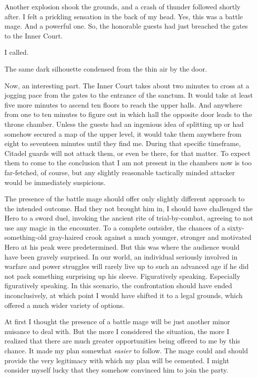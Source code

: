 Another explosion shook the grounds, and a crash of thunder followed shortly after. I felt a prickling sensation in the back of my head. Yes, this was a battle mage. And a powerful one. So, the honorable guests had just breached the gates to the Inner Court.

 I called.

 The same dark silhouette condensed from the thin air by the door.



Now, an interesting part. The Inner Court takes about two minutes to cross at a jogging pace from the gates to the entrance of the sanctum. It would take at least five more minutes to ascend ten floors to reach the upper halls. And anywhere from one to ten minutes to figure out in which hall the opposite door leads to the throne chamber. Unless the guests had an ingenious idea of splitting up or had somehow secured a map of the upper level, it would take them anywhere from eight to seventeen minutes until they find me. During that specific timeframe, Citadel guards will not attack them, or even be there, for that matter. To expect them to come to the conclusion that I am not present in the chambers now is too far-fetched, of course, but any slightly reasonable tactically minded attacker would be immediately suspicious.

The presence of the battle mage should offer only slightly different approach to the intended outcome. Had they not brought him in, I should have challenged the Hero to a sword duel, invoking the ancient rite of trial-by-combat, agreeing to not use any magic in the encounter. To a complete outsider, the chances of a sixty-something-old gray-haired crook against a much younger, stronger and motivated Hero at his peak were predetermined. But this was where the audience would have been gravely surprised. In our world, an individual seriously involved in warfare and power struggles will rarely live up to such an advanced age if he did not pack something surprising up his sleeve. Figuratively speaking. Especially figuratively speaking. In this scenario, the confrontation should have ended inconclusively, at which point I would have shifted it to a legal grounds, which offered a much wider variety of options.

At first I thought the presence of a battle mage will be just another minor nuisance to deal with. But the more I considered the situation, the more I realized that there are much greater opportunities being offered to me by this chance. It made my plan somewhat \textit{easier} to follow. The mage could and should provide the very legitimacy with which my plan will be cemented. I might consider myself lucky that they somehow convinced him to join the party.

